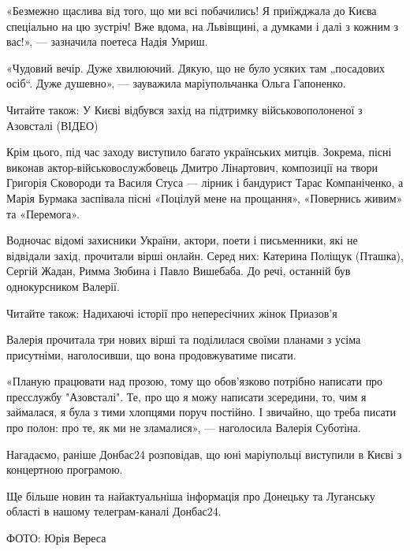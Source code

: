 «Безмежно щаслива від того, що ми всі побачились! Я приїжджала до Києва
спеціально на цю зустріч! Вже вдома, на Львівщині, а думками і далі з кожним з
вас!», — зазначила поетеса Надія Умриш.

«Чудовий вечір. Дуже хвилюючий. Дякую, що не було усяких там „посадових осіб“.
Дуже душевно», — зауважила маріупольчанка Ольга Гапоненко.

Читайте також: У Києві відбувся захід на підтримку військовополоненої з
Азовсталі (ВІДЕО)

Крім цього, під час заходу виступило багато українських митців. Зокрема, пісні
виконав актор-військовослужбовець Дмитро Лінартович, композиції на твори
Григорія Сковороди та Василя Стуса — лірник і бандурист Тарас Компаніченко, а
Марія Бурмака заспівала пісні «Поцілуй мене на прощання», «Повернись живим» та
«Перемога».

Водночас відомі захисники України, актори, поети і письменники, які не
відвідали захід, прочитали вірші онлайн. Серед них: Катерина Поліщук (Пташка),
Сергій Жадан, Римма Зюбина і Павло Вишебаба. До речі, останній був
однокурсником Валерії.

Читайте також: Надихаючі історії про непересічних жінок Приазов’я

Валерія прочитала три нових вірші та поділилася своїми планами з усіма
присутніми, наголосивши, що вона продовжуватиме писати.

«Планую працювати над прозою, тому що обов’язково потрібно написати про
пресслужбу "Азовсталі". Те, про що я можу написати зсередини, то, чим я
займалася, я була з тими хлопцями поруч постійно. І звичайно, що треба писати
про полон: про те, як ми не зламалися», — наголосила Валерія Суботіна.

Нагадаємо, раніше Донбас24 розповідав, що юні маріупольці виступили в Києві з
концертною програмою.

Ще більше новин та найактуальніша інформація про Донецьку та Луганську області
в нашому телеграм-каналі Донбас24.

ФОТО: Юрія Вереса
